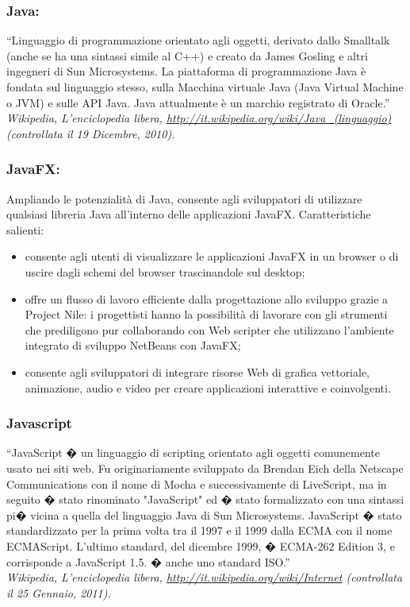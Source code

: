 \subsubsection*{Java:} ``Linguaggio di programmazione orientato agli oggetti,
derivato dallo Smalltalk (anche se ha una sintassi simile al C++) e creato da
James Gosling e altri ingegneri di Sun Microsystems. La piattaforma di
programmazione Java \`e fondata sul linguaggio stesso, sulla Macchina virtuale
Java (Java Virtual Machine o JVM) e sulle API Java. Java attualmente \`e un
marchio registrato di Oracle.''\\
\emph{Wikipedia, L'enciclopedia libera,
\url{http://it.wikipedia.org/wiki/Java_(linguaggio)} (controllata il 19
Dicembre, 2010).}

\subsubsection*{JavaFX:} Ampliando le potenzialit\`a di Java, consente agli
sviluppatori di utilizzare qualsiasi libreria Java all'interno delle applicazioni JavaFX.
Caratteristiche salienti:
\begin{itemize}
\item consente agli utenti di visualizzare le applicazioni JavaFX in un browser
o di uscire dagli schemi del browser trascinandole sul desktop; 
\item offre un flusso di lavoro efficiente dalla progettazione allo sviluppo
grazie a Project Nile: i progettisti hanno la possibilit\`a di lavorare con gli strumenti
che prediligono pur collaborando con Web scripter che utilizzano l'ambiente
integrato di sviluppo NetBeans con JavaFX;
\item consente agli sviluppatori di integrare risorse Web di grafica vettoriale,
animazione, audio e video per creare applicazioni interattive e coinvolgenti.
\end{itemize}

\subsubsection*{Javascript}
``JavaScript � un linguaggio di scripting orientato agli oggetti comunemente
usato nei siti web. Fu originariamente sviluppato da Brendan Eich della Netscape
Communications con il nome di Mocha e successivamente di LiveScript, ma in
seguito � stato rinominato "JavaScript" ed � stato formalizzato con una sintassi
pi� vicina a quella del linguaggio Java di Sun Microsystems. JavaScript � stato
standardizzato per la prima volta tra il 1997 e il 1999 dalla ECMA con il nome
ECMAScript. L'ultimo standard, del dicembre 1999, � ECMA-262 Edition 3, e
corrisponde a JavaScript 1.5. � anche uno standard ISO.''\\ 
\emph{Wikipedia, L'enciclopedia libera,
\url{http://it.wikipedia.org/wiki/Internet} (controllata il 25 Gennaio, 2011).}


